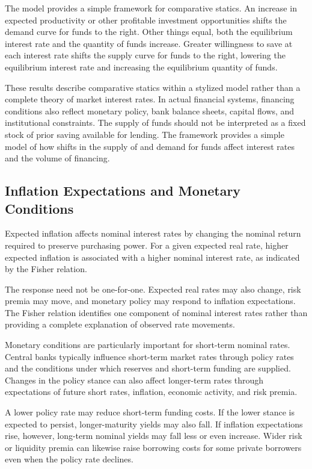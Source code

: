 The model provides a simple framework for comparative statics. An increase in expected productivity or other profitable investment opportunities shifts the demand curve for funds to the right. Other things equal, both the equilibrium interest rate and the quantity of funds increase. Greater willingness to save at each interest rate shifts the supply curve for funds to the right, lowering the equilibrium interest rate and increasing the equilibrium quantity of funds.

These results describe comparative statics within a stylized model rather than a complete theory of market interest rates. In actual financial systems, financing conditions also reflect monetary policy, bank balance sheets, capital flows, and institutional constraints. The supply of funds should not be interpreted as a fixed stock of prior saving available for lending. The framework provides a simple model of how shifts in the supply of and demand for funds affect interest rates and the volume of financing.


\subsection{Inflation Expectations and Monetary Conditions}

Expected inflation affects nominal interest rates by changing the nominal return required to preserve purchasing power. For a given expected real rate, higher expected inflation is associated with a higher nominal interest rate, as indicated by the Fisher relation.

The response need not be one-for-one. Expected real rates may also change, risk premia may move, and monetary policy may respond to inflation expectations. The Fisher relation identifies one component of nominal interest rates rather than providing a complete explanation of observed rate movements.

Monetary conditions are particularly important for short-term nominal rates. Central banks typically influence short-term market rates through policy rates and the conditions under which reserves and short-term funding are supplied. Changes in the policy stance can also affect longer-term rates through expectations of future short rates, inflation, economic activity, and risk premia.

A lower policy rate may reduce short-term funding costs. If the lower stance is expected to persist, longer-maturity yields may also fall. If inflation expectations rise, however, long-term nominal yields may fall less or even increase. Wider risk or liquidity premia can likewise raise borrowing costs for some private borrowers even when the policy rate declines.


